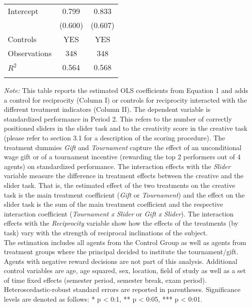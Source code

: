 \begin{table}[h]
\begin{center}
{\begin{tabular}{lcc}
Intercept           &       0.799   &       0.833   \\
                    &     (0.600)   &     (0.607)   \\[2mm]
\noalign{\smallskip}\hline
 Controls & YES & YES \\
\hline
Observations        &         348   &         348   \\
$R^2$               &       0.564   &       0.568   \\
\hline\hline\noalign{\medskip}
\end{tabular}
\begin{minipage}{\textwidth}
\footnotesize {\it Note:} This table reports the estimated OLS coefficients from Equation 1 and adds a control for reciprocity (Column I) or controls for reciprocity interacted with the different treatment indicators (Column II). 
The dependent variable is standardized performance in Period 2. This refers to the number of correctly positioned sliders in the slider task and to the creativity score in the creative task (please refer to section 3.1 for a description of the scoring procedure). 
The treatment dummies \textit{Gift} and \textit{Tournament} capture the effect of an unconditional wage gift or of a tournament incentive (rewarding the top 2 performers out of 4 agents) on standardized performance. 
The interaction effects with the \textit{Slider} variable measure the difference in treatment effects between the creative and the slider task. 
That is, the estimated effect of the two treatments on the creative task is the main treatment coefficient (\textit{Gift} or \textit{Tournament}) and the effect on the slider task is the sum of the main treatment coefficient and the respective interaction coefficient (\textit{Tournament x Slider} or \textit{Gift x Slider}). 
The interaction effects with the \textit{Reciprocity} variable show how the effects of the treatments (by task) vary with the strength of reciprocal inclinations of the subject. \\
The estimation includes all agents from the Control Group as well as agents from treatment groups where the principal decided to institute the tournament/gift. Agents with negative reward decisions are not part of this analysis. 
Additional control variables are age, age squared, sex, location, field of study as well as a set of time fixed effects (semester period, semester break, exam period). 
Heteroscedastic-robust standard errors are reported in parentheses. Significance levels are denoted as follows: * p < 0:1, ** p < 0:05, *** p < 0:01. 
\end{minipage}}
\end{center}
\label{tab:EQ_Pooled_Results}
\end{table}
